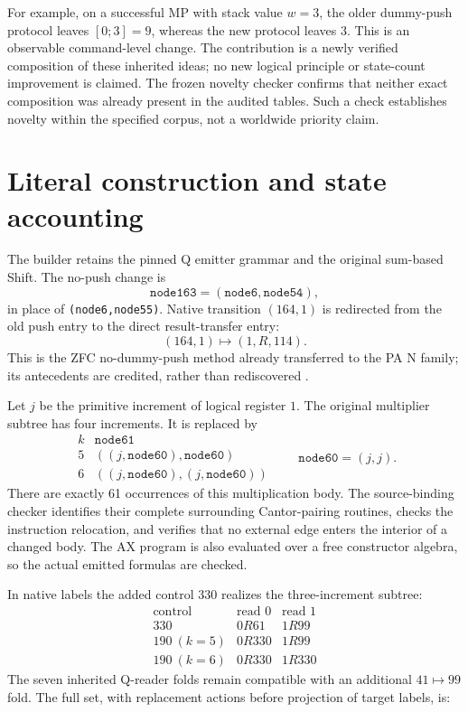 \documentclass[11pt,letterpaper]{article}
\begin{document}
For example, on a successful MP with stack value $w=3$, the older dummy-push
protocol leaves $[0;3]=9$, whereas the new protocol leaves $3$. This is an
observable command-level change. The contribution is a newly verified composition
of these inherited ideas; no new logical principle or state-count improvement is
claimed. The frozen novelty checker confirms that neither exact composition
was already present in the audited tables. Such a check establishes novelty
within the specified corpus, not a worldwide priority claim.

\section{Literal construction and state accounting}
\label{sec:construction}

The builder retains the pinned Q emitter grammar and the original sum-based
Shift. The no-push change is
\[
 \texttt{node163}=(\texttt{node6},\texttt{node54}),
\]
in place of \texttt{(node6,node55)}. Native transition $(164,1)$ is redirected
from the old push entry to the direct result-transfer entry:
\[
 (164,1)\mapsto(1,R,114).
\]
This is the ZFC no-dummy-push method already transferred to the PA N family;
its antecedents are credited, rather than rediscovered \cite{nopush,zfc}.

Let $j$ be the primitive increment of logical register $1$. The original
multiplier subtree has four increments. It is replaced by
\[
 \begin{array}{c|c}
 k&\texttt{node61}\\\hline
 5&((j,\texttt{node60}),\texttt{node60})\\
 6&((j,\texttt{node60}),(j,\texttt{node60}))
 \end{array}
 \qquad\texttt{node60}=(j,j).
\]
There are exactly 61 occurrences of this multiplication body. The source-binding
checker identifies their complete surrounding Cantor-pairing routines, checks
the instruction relocation, and verifies that no external edge enters the
interior of a changed body. The AX program is also evaluated over a free
constructor algebra, so the actual emitted formulas are checked.

In native labels the added control $330$ realizes the three-increment subtree:
\[
 \begin{array}{c|cc}
 \text{control}&\text{read }0&\text{read }1\\\hline
 330&0R61&1R99\\
 190\ (k=5)&0R330&1R99\\
 190\ (k=6)&0R330&1R330
 \end{array}
\]
The seven inherited Q-reader folds remain compatible with an additional
$41\mapsto99$ fold. The full set, with replacement actions before projection
of target labels, is:

\end{document}
